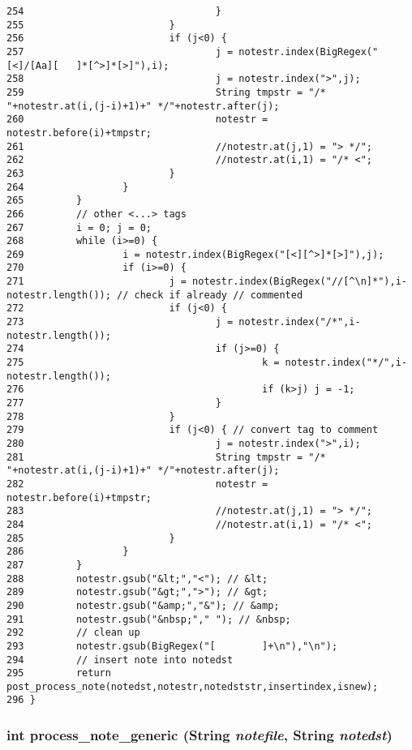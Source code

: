 \begin{verbatim}
254                                 }
255                         }
256                         if (j<0) {
257                                 j = notestr.index(BigRegex("[<]/[Aa][   ]*[^>]*[>]"),i);
258                                 j = notestr.index(">",j);
259                                 String tmpstr = "/* "+notestr.at(i,(j-i)+1)+" */"+notestr.after(j);
260                                 notestr = notestr.before(i)+tmpstr;
261                                 //notestr.at(j,1) = "> */";
262                                 //notestr.at(i,1) = "/* <";
263                         }
264                 }
265         }
266         // other <...> tags
267         i = 0; j = 0;
268         while (i>=0) {
269                 i = notestr.index(BigRegex("[<][^>]*[>]"),j);
270                 if (i>=0) {
271                         j = notestr.index(BigRegex("//[^\n]*"),i-notestr.length()); // check if already // commented
272                         if (j<0) {
273                                 j = notestr.index("/*",i-notestr.length());
274                                 if (j>=0) {
275                                         k = notestr.index("*/",i-notestr.length());
276                                         if (k>j) j = -1;
277                                 }
278                         }
279                         if (j<0) { // convert tag to comment
280                                 j = notestr.index(">",i);
281                                 String tmpstr = "/* "+notestr.at(i,(j-i)+1)+" */"+notestr.after(j);
282                                 notestr = notestr.before(i)+tmpstr;
283                                 //notestr.at(j,1) = "> */";
284                                 //notestr.at(i,1) = "/* <";
285                         }
286                 }
287         }
288         notestr.gsub("&lt;","<"); // &lt;
289         notestr.gsub("&gt;",">"); // &gt;
290         notestr.gsub("&amp;","&"); // &amp;
291         notestr.gsub("&nbsp;"," "); // &nbsp;
292         // clean up
293         notestr.gsub(BigRegex("[        ]+\n"),"\n");
294         // insert note into notedst
295         return post_process_note(notedst,notestr,notedststr,insertindex,isnew);
296 }
\end{verbatim}\normalsize 
{}
\subsubsection{\setlength{\rightskip}{0pt plus 5cm}int process\_\-note\_\-generic ({\bf String} {\em notefile}, {\bf String} {\em notedst})}\label{note_8cc_a7}




